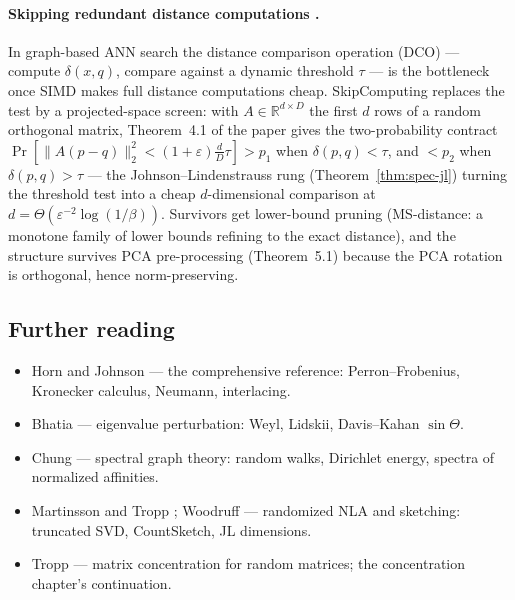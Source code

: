 \paragraph{Skipping redundant distance computations \citep{sigmod26-265}.}
In graph-based ANN search the distance comparison operation (DCO) ---
compute $\delta(x,q)$, compare against a dynamic threshold $\tau$ --- is
the bottleneck once SIMD makes full distance computations cheap.
SkipComputing replaces the test by a projected-space screen: with $A \in
\mathbb{R}^{d \times D}$ the first $d$ rows of a random orthogonal matrix,
Theorem~4.1 of the paper gives the two-probability contract
$\Pr[\|A(p-q)\|_2^2 < (1+\varepsilon)\tfrac{d}{D}\tau] > p_1$ when
$\delta(p,q) < \tau$, and $< p_2$ when $\delta(p,q) > \tau$ --- the
Johnson--Lindenstrauss rung (Theorem~\ref{thm:spec-jl}) turning the
threshold test into a cheap $d$-dimensional comparison at $d =
\Theta(\varepsilon^{-2}\log(1/\beta))$. Survivors get lower-bound pruning
(MS-distance: a monotone family of lower bounds refining to the exact
distance), and the structure survives PCA pre-processing (Theorem~5.1)
because the PCA rotation is orthogonal, hence norm-preserving.

\subsection{Further reading}

\begin{itemize}
\item Horn and Johnson \citep{spectral-matrix-bg1} --- the comprehensive
  reference: Perron--Frobenius, Kronecker calculus, Neumann, interlacing.
\item Bhatia \citep{spectral-matrix-bg2} --- eigenvalue perturbation: Weyl,
  Lidskii, Davis--Kahan $\sin\Theta$.
\item Chung \citep{spectral-matrix-bg5} --- spectral graph theory: random
  walks, Dirichlet energy, spectra of normalized affinities.
\item Martinsson and Tropp \citep{spectral-matrix-bg3}; Woodruff
  \citep{spectral-matrix-bg4} --- randomized NLA and sketching: truncated
  SVD, CountSketch, JL dimensions.
\item Tropp \citep{spectral-matrix-bg6} --- matrix concentration for random
  matrices; the concentration chapter's continuation.
\end{itemize}


